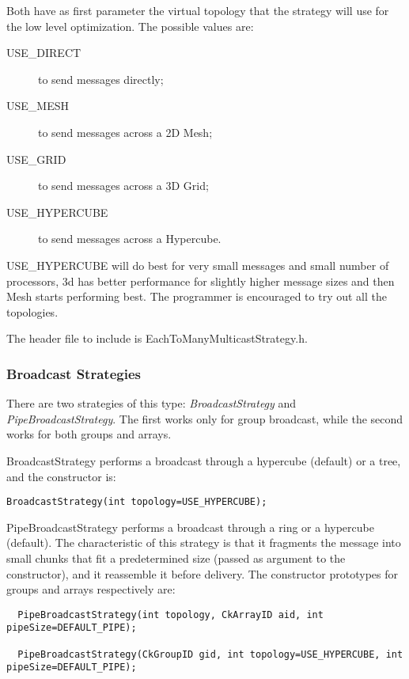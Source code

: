 {Both have as first parameter the virtual topology that the strategy will use for
the low level optimization. The possible values are:

\begin{description}
\item[USE\_DIRECT] to send messages directly;
\item[USE\_MESH] to send messages across a 2D Mesh;
\item[USE\_GRID] to send messages across a 3D Grid;
\item[USE\_HYPERCUBE] to send messages across a Hypercube.
\end{description}

USE\_HYPERCUBE will do best for very small messages and small number of
processors, 3d has better performance for slightly higher message sizes and then
Mesh starts performing best. The programmer is encouraged to try out all the
topologies.

The header file to include is {\textrm{EachToManyMulticastStrategy.h}}.

\subsubsection{Broadcast Strategies}

There are two strategies of this type: {\em BroadcastStrategy} and {\em
PipeBroadcastStrategy}. The first works only for group broadcast, while the
second works for both groups and arrays.

BroadcastStrategy performs a broadcast through a hypercube (default) or a tree,
and the constructor is:

\begin{verbatim}
BroadcastStrategy(int topology=USE_HYPERCUBE);
\end{verbatim}

PipeBroadcastStrategy performs a broadcast through a ring or a hypercube
(default). The characteristic of this strategy is that it fragments the message
into small chunks that fit a predetermined size (passed as argument to the
constructor), and it reassemble it before delivery. The constructor prototypes
for groups and arrays respectively are:

\begin{verbatim}
  PipeBroadcastStrategy(int topology, CkArrayID aid, int pipeSize=DEFAULT_PIPE);

  PipeBroadcastStrategy(CkGroupID gid, int topology=USE_HYPERCUBE, int pipeSize=DEFAULT_PIPE);
\end{verbatim}

}
